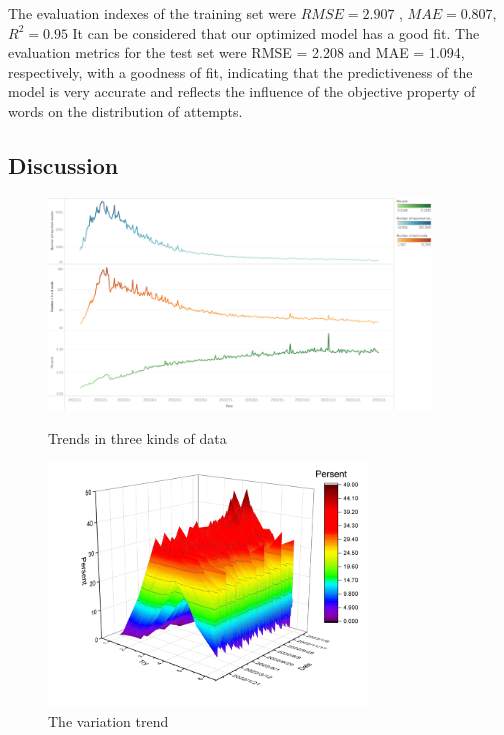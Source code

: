 \documentclass[a4paper]{jpconf}
\begin{document}
The evaluation indexes of the training set were $RMSE=2.907$ , $MAE=0.807$,$R^2=0.95$ It can be considered that our optimized model has a good fit.
The evaluation metrics for the test set were RMSE = 2.208 and MAE = 1.094, respectively, with a goodness of fit, indicating that the predictiveness of the model is very accurate and reflects the influence of the objective property of words on the distribution of attempts.


\subsection{Discussion}

\begin{figure}[h]
\begin{minipage}{18pc}
\includegraphics[width=24pc]{img/insight1.png}
\caption{\label{fig:insignt1}Trends in three kinds of data}
\end{minipage}\hspace{2pc}%
\begin{minipage}{18pc}
\includegraphics[width=20pc]{img/insight2.png}
\caption{\label{fig:insignt2}The variation trend}
\end{minipage} 
\end{figure}
\end{document}
